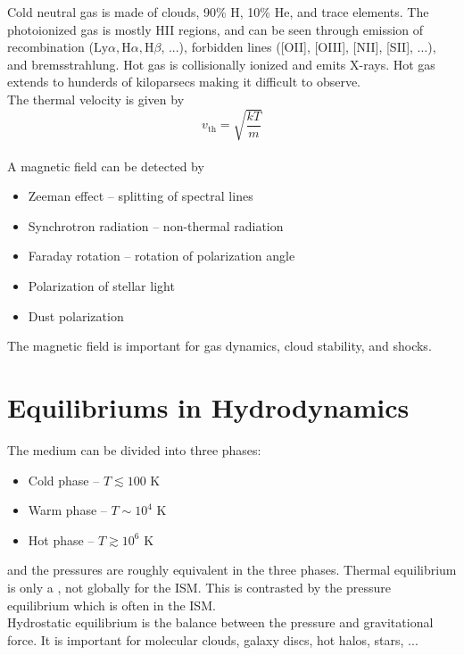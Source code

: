Cold neutral gas is made of clouds, 90\% H, 10\% He, and trace elements. The photoionized gas is mostly HII regions, and can be seen through emission of \textsf{recombination} ($\text{Ly}\alpha, \text{H}\alpha, \text{H}\beta$, ...), \textsf{forbidden lines} ([OII], [OIII], [NII], [SII], ...), and \textsf{bremsstrahlung}. Hot gas is collisionally ionized and emits X-rays. Hot gas extends to hunderds of kiloparsecs making it difficult to observe. 
\\

The thermal velocity is given by 
\begin{equation}
  v_{\text{th}} = \sqrt{\frac{kT}{m}} 
\end{equation}\\

A magnetic field can be detected by 
\begin{itemize}
  \item \textsf{Zeeman effect} -- splitting of spectral lines
  \item \textsf{Synchrotron radiation} -- non-thermal radiation
  \item \textsf{Faraday rotation} -- rotation of polarization angle
  \item \textsf{Polarization of stellar light} 
  \item \textsf{Dust polarization} 
\end{itemize}

The magnetic field is important for gas dynamics, cloud stability, and shocks.

\section*{Equilibriums in Hydrodynamics}
The medium can be divided into three phases:
\begin{itemize}
  \item \textsf{Cold phase} -- $T \lesssim 100$ K 
  \item \textsf{Warm phase} -- $T \sim 10^4$ K 
  \item \textsf{Hot phase} -- $T \gtrsim 10^6$ K
\end{itemize}
and the pressures are roughly equivalent in the three phases. \textsf{Thermal equilibrium} is only a , not globally for the ISM. This is contrasted by the \textsf{pressure equilibrium} which is often  in the ISM.\\
\textsf{Hydrostatic equilibrium} is the balance between the pressure and gravitational force. It is important for molecular clouds, galaxy discs, hot halos, stars, ...\\

